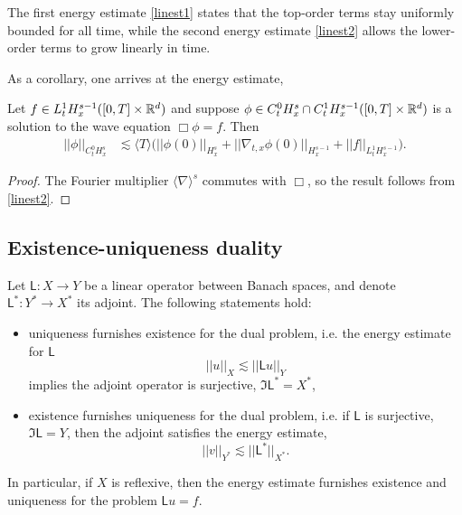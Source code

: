 \begin{remark}
    The first energy estimate \eqref{linest1} states that the top-order terms stay uniformly bounded for all time, while the second energy estimate \eqref{linest2} allows the lower-order terms to grow linearly in time. 
\end{remark}

As a corollary, one arrives at the energy estimate, 

\begin{theorem}
    Let $f \in L^1_t H^{s -1}_x ([0, T] \times \mathbb R^d)$ and suppose $\phi \in C^0_t H^s_x \cap C^1_t H^{s - 1}_x ([0, T] \times \mathbb R^d)$ is a solution to the wave equation $\Box \phi = f$. Then 
        \begin{align}
            ||\phi||_{C^0_t H^s_x}
                &\lesssim \langle T \rangle \Big( ||\phi (0)||_{H^s_x} + ||\nabla_{t, x} \phi (0)||_{H^{s - 1}_x} + ||f||_{L^1_t H^{s - 1}_x }\Big).\label{eq:linest4}
        \end{align}
\end{theorem}

\begin{proof}
    The Fourier multiplier $\langle \nabla \rangle^s$ commutes with $\Box$, so the result follows from \eqref{linest2}. 
\end{proof}

\subsection{Existence-uniqueness duality}





\begin{lemma}
    Let $\mathsf L : X \to Y$ be a linear operator between Banach spaces, and denote $\mathsf L^* : Y^* \to X^*$ its adjoint. The following statements hold:
        \begin{itemize}
            \item uniqueness furnishes existence for the dual problem, i.e. the energy estimate for $\mathsf L$ 
                \[ 
                    ||u||_X \lesssim ||\mathsf L u||_Y
                \]
            implies the adjoint operator is surjective, $\Im \mathsf L^* = X^*$,

            \item existence furnishes uniqueness for the dual problem, i.e. if $\mathsf L$ is surjective, $\Im \mathsf L = Y$, then the adjoint satisfies the energy estimate,
                \[
                    ||v||_{Y^*} 
                        \lesssim ||\mathsf L^* ||_{X^*}. 
                \]
        \end{itemize}
    In particular, if $X$ is reflexive, then the energy estimate furnishes existence and uniqueness for the problem $\mathsf L u = f$. 
\end{lemma}



